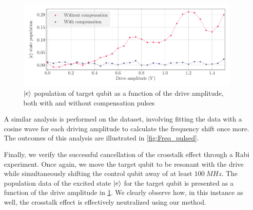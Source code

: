 \begin{figure}[b!]
    \centering
    \includegraphics[width=0.75\linewidth]{Images//Chap2.0/Rabi_pulsed_cancellation.pdf}
    \caption{$\ket{e}$ population of target qubit as a function of the drive amplitude, both with and without compensation pulses}
    \label{fig:Rabi_canc_pulsed}
\end{figure}

A similar analysis is performed on the dataset, involving fitting the data with a cosine wave for each driving amplitude to calculate the frequency shift once more.
The outcomes of this analysis are illustrated in \cref{fig:Freq_pulsed}.

Finally, we verify the successful cancellation of the crosstalk effect through a Rabi experiment.
Once again, we move the target qubit to be resonant with the drive while simultaneously shifting the control qubit away of at least $\SI{100}{MHz}$.
The population data of the excited state $\ket{e}$ for the target qubit is presented as a function of the drive amplitude in \cref{fig:Rabi_canc_pulsed}.
We clearly observe how, in this instance as well, the crosstalk effect is effectively neutralized using our method.